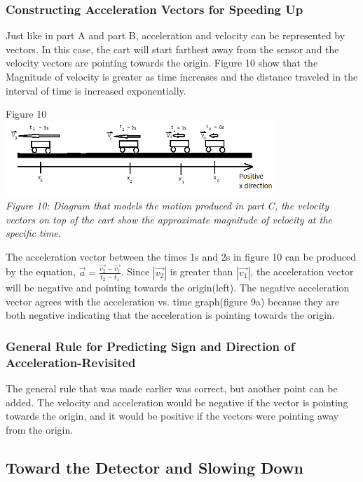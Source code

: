 \documentclass[aps,letterpaper,11pt]{revtex4}
\begin{document}
\subsubsection{Constructing Acceleration Vectors for Speeding Up}

Just like in part A and part B, acceleration and velocity can be represented by vectors. In this case, the cart will start farthest away from the sensor and the velocity vectors are pointing towards the origin. Figure 10 show that the Magnitude of velocity is greater as time increases and the distance traveled in the interval of time is increased exponentially. 

\begin{center}
Figure 10\\
\includegraphics[width=4in]{VectorPartC.png}\\
\textit{Figure 10: Diagram that models the motion produced in part C, the velocity vectors on top of the cart show the approximate magnitude of velocity at the specific time.}
\end{center}

The acceleration vector between the times 1s and 2s in figure 10 can be produced by the equation, $\vec{a} = \frac{\vec{v_2} - \vec{v_1}}{t_2 - t_1}$. Since $|\vec{v_2}|$ is greater than $|\vec{v_1}|$, the acceleration vector will be negative and pointing towards the origin(left). The negative acceleration vector agrees with the acceleration vs. time graph(figure 9a) because they are both negative indicating that the acceleration is pointing towards the origin. 

\subsubsection{General Rule for Predicting Sign and Direction of Acceleration-Revisited}

The general rule that was made earlier was correct, but another point can be added. The velocity and acceleration would be negative if the vector is pointing towards the origin, and it would be positive if the vectors were pointing away from the origin.

\subsection{Toward the Detector and Slowing Down}
\end{document}
